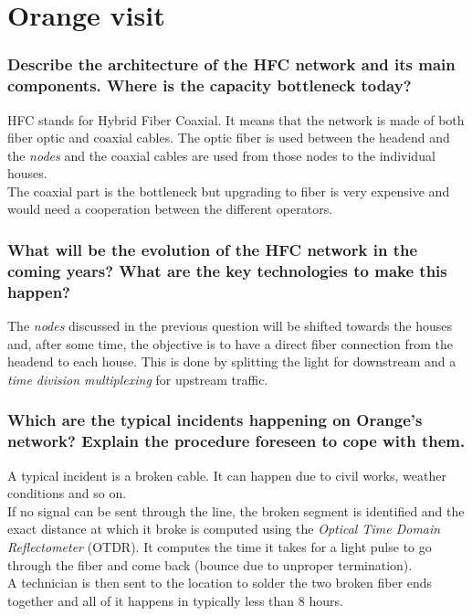 \documentclass[10pt,a4paper]{ULBreport}
\begin{document}
\chapter{Orange visit}

\subsection{Describe the architecture of the HFC network and its main components. Where is the capacity bottleneck today?}

HFC stands for Hybrid Fiber Coaxial. It means that the network is made of both fiber optic and coaxial cables. The optic fiber is used between the headend and the \textit{nodes} and the coaxial cables are used from those nodes to the individual houses. \\
The coaxial part is the bottleneck but upgrading to fiber is very expensive and would need a cooperation between the different operators.

\subsection{What will be the evolution of the HFC network in the coming years? What are the key technologies to make this happen?}

The \textit{nodes} discussed in the previous question will be shifted towards the houses and, after some time, the objective is to have a direct fiber connection from the headend to each house. This is done by splitting the light for downstream and a \textit{time division multiplexing} for upstream traffic. 

\subsection{Which are the typical incidents happening on Orange's network? Explain the procedure foreseen to cope with them.}

A typical incident is a broken cable. It can happen due to civil works, weather conditions and so on. \\
If no signal can be sent through the line, the broken segment is identified and the exact distance at which it broke is computed using the \textit{Optical Time Domain Reflectometer} (OTDR). It computes the time it takes for a light pulse to go through the fiber and come back (bounce due to unproper termination).\\
A technician is then sent to the location to solder the two broken fiber ends together and all of it happens in typically less than 8 hours.
\end{document}

